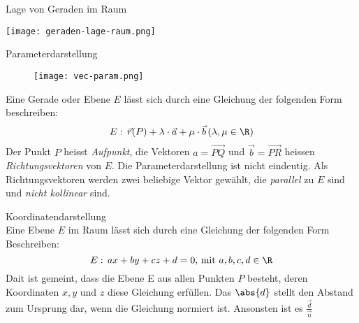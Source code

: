     \begin{theorem}{Lage von Geraden im Raum}
        \begin{center}
            \texttt{[image: geraden-lage-raum.png]}
        \end{center}
    \end{theorem}

    \begin{definition}{Parameterdarstellung}
        \begin{wrapfigure}{r}{0.3\textwidth}
            \texttt{[image: vec-param.png]}
        \end{wrapfigure}
        Eine Gerade oder Ebene $E$ lässt sich durch eine Gleichung der folgenden Form beschreiben:
        \begin{equation*}
            E:\,\vec{r}(P)+\lambda\cdot\vec{a}+\mu\cdot\vec{b}\, (\lambda,\mu\in\R)
        \end{equation*}
        Der Punkt $P$ heisst \textit{Aufpunkt}, die Vektoren $a=\overrightarrow{PQ}$ und 
        $\vec{b}=\overrightarrow{PR}$ heissen \textit{Richtungsvektoren} von $E$.
        Die Parameterdarstellung ist nicht eindeutig. Als Richtungsvektoren werden zwei beliebige
        Vektor gewählt, die \textit{parallel} zu $E$ sind und \textit{nicht kollinear} sind.
    \end{definition}

    \begin{definition}{Koordinatendarstellung}\\
        Eine Ebene $E$ im Raum lässt sich durch eine Gleichung der folgenden Form Beschreiben:
        \begin{equation*}
            E:\,ax+by+cz+d=0,\, \text{mit } a,b,c,d\in \R
        \end{equation*}
        Dait ist gemeint, dass die Ebene E aus allen Punkten $P$ besteht, deren Koordinaten
        $x, y$ und $z$ diese Gleichung erfüllen.
        Das $\abs{d}$ stellt den Abstand zum Ursprung dar, wenn die Gleichung normiert ist. 
        Ansonsten ist es $\frac{\vec{d}}{\vec{n}}$ 
    \end{definition}

